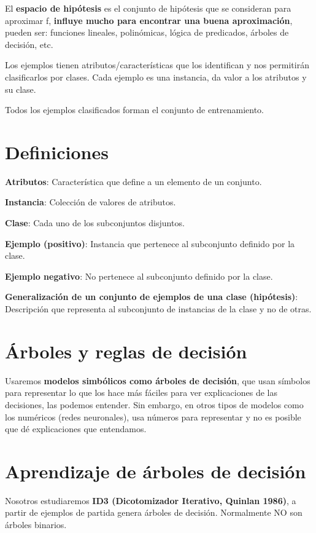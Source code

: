 \documentclass[12pt, twoside, openright]{report} %
\begin{document}
El \textbf{espacio de hipótesis} es el conjunto de hipótesis que se consideran para aproximar f, \textbf{influye mucho para encontrar una
	buena aproximación}, pueden ser: funciones lineales, polinómicas, lógica de predicados, árboles de decisión, etc.

Los ejemplos tienen atributos/características que los identifican y nos permitirán clasificarlos por clases. Cada ejemplo es una instancia, da valor a los atributos y su clase.

Todos los ejemplos clasificados forman el conjunto de entrenamiento.

\section{Definiciones}

\textbf{Atributos}: Característica que define a un elemento de un conjunto.

\textbf{Instancia}: Colección de valores de atributos.

\textbf{Clase}: Cada uno de los subconjuntos disjuntos.

\textbf{Ejemplo (positivo)}: Instancia que pertenece al subconjunto definido por la clase.

\textbf{Ejemplo negativo}: No pertenece al subconjunto definido por la clase.

\textbf{Generalización de un conjunto de ejemplos de una clase (hipótesis)}: Descripción que representa al subconjunto de instancias de la clase y no de otras.

\section{Árboles y reglas de decisión}

Usaremos \textbf{modelos simbólicos como árboles de decisión}, que usan símbolos para representar lo que los hace más fáciles para ver explicaciones de las decisiones, las podemos entender. Sin embargo, en otros tipos de modelos como los numéricos (redes neuronales), usa números para representar y no es posible que dé explicaciones que entendamos.

\section{Aprendizaje de árboles de
  decisión}

Nosotros estudiaremos \textbf{ID3 (Dicotomizador Iterativo, Quinlan 1986)}, a partir de ejemplos de partida genera árboles de decisión. Normalmente NO son árboles binarios.
\end{document}
